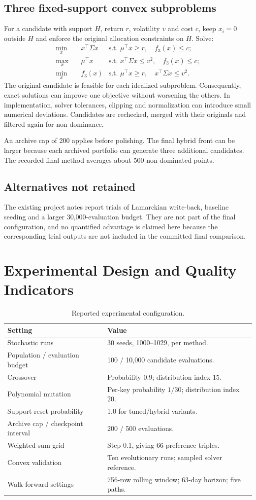 \documentclass[12pt,a4paper]{article}
\newcommand{\newsec}[1]{\section{#1}}
\begin{document}
\subsection{Three fixed-support convex subproblems}
For a candidate with support $H$, return $r$, volatility $v$ and cost $c$, keep $x_i=0$ outside $H$ and enforce the original allocation constraints on $H$. Solve:
\begin{align*}
\min_x\quad &x^\top\Sigma x &\text{s.t. }\mu^\top x\geq r,\quad f_3(x)\leq c;\\
\max_x\quad &\mu^\top x &\text{s.t. }x^\top\Sigma x\leq v^2,\quad f_3(x)\leq c;\\
\min_x\quad &f_3(x) &\text{s.t. }\mu^\top x\geq r,\quad x^\top\Sigma x\leq v^2.
\end{align*}
The original candidate is feasible for each idealized subproblem. Consequently, exact solutions can improve one objective without worsening the others. In implementation, solver tolerances, clipping and normalization can introduce small numerical deviations. Candidates are rechecked, merged with their originals and filtered again for non-dominance.

An archive cap of 200 applies before polishing. The final hybrid front can be larger because each archived portfolio can generate three additional candidates. The recorded final method averages about 500 non-dominated points.
\subsection{Alternatives not retained}
The existing project notes report trials of Lamarckian write-back, baseline seeding and a larger 30,000-evaluation budget. They are not part of the final configuration, and no quantified advantage is claimed here because the corresponding trial outputs are not included in the committed final comparison.

\newsec{Experimental Design and Quality Indicators}
\begin{table}[H]\centering
\begin{tabularx}{\linewidth}{@{}p{58mm}Y@{}}\toprule
Setting & Value\\\midrule
Stochastic runs & 30 seeds, 1000--1029, per method.\\
Population / evaluation budget & 100 / 10,000 candidate evaluations.\\
Crossover & Probability 0.9; distribution index 15.\\
Polynomial mutation & Per-key probability $1/30$; distribution index 20.\\
Support-reset probability & 1.0 for tuned/hybrid variants.\\
Archive cap / checkpoint interval & 200 / 500 evaluations.\\
Weighted-sum grid & Step 0.1, giving 66 preference triples.\\
Convex validation & Ten evolutionary runs; sampled solver reference.\\
Walk-forward settings & 756-row rolling window; 63-day horizon; five paths.\\\bottomrule
\end{tabularx}
\caption{Reported experimental configuration.}
\end{table}
\end{document}
